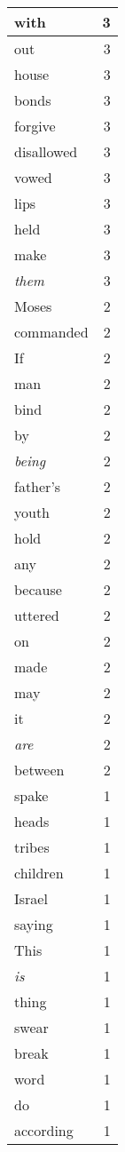 \begin{center}
\begin{longtable}{l|r}
with & 3\\ \hline 
out & 3\\ \hline 
house & 3\\ \hline 
bonds & 3\\ \hline 
forgive & 3\\ \hline 
disallowed & 3\\ \hline 
vowed & 3\\ \hline 
lips & 3\\ \hline 
held & 3\\ \hline 
make & 3\\ \hline 
\emph{them} & 3\\ \hline 
Moses & 2\\ \hline 
commanded & 2\\ \hline 
If & 2\\ \hline 
man & 2\\ \hline 
bind & 2\\ \hline 
by & 2\\ \hline 
\emph{being} & 2\\ \hline 
father's & 2\\ \hline 
youth & 2\\ \hline 
hold & 2\\ \hline 
any & 2\\ \hline 
because & 2\\ \hline 
uttered & 2\\ \hline 
on & 2\\ \hline 
made & 2\\ \hline 
may & 2\\ \hline 
it & 2\\ \hline 
\emph{are} & 2\\ \hline 
between & 2\\ \hline 
spake & 1\\ \hline 
heads & 1\\ \hline 
tribes & 1\\ \hline 
children & 1\\ \hline 
Israel & 1\\ \hline 
saying & 1\\ \hline 
This & 1\\ \hline 
\emph{is} & 1\\ \hline 
thing & 1\\ \hline 
swear & 1\\ \hline 
break & 1\\ \hline 
word & 1\\ \hline 
do & 1\\ \hline 
according & 1\\ \hline 

\end{longtable}
\end{center}
